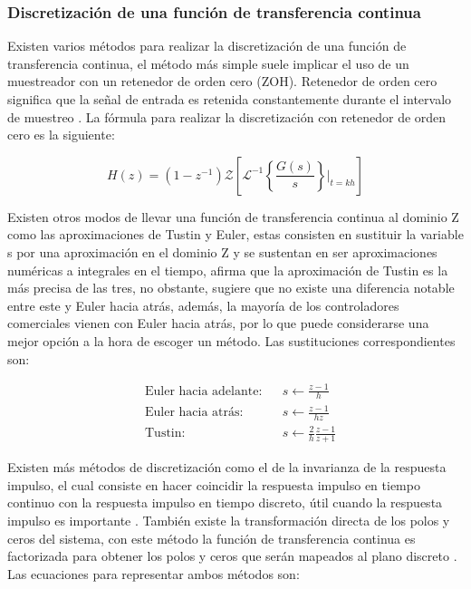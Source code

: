         \subsubsection{Discretización de una función de transferencia continua}
            
            Existen varios métodos para realizar la discretización de una función de transferencia continua, el método más simple suele implicar el uso de un muestreador con un retenedor de orden cero (ZOH). Retenedor de orden cero significa que la señal de entrada es retenida constantemente durante el intervalo de muestreo \Parencite{haugen2005discrete}. La fórmula para realizar la discretización con retenedor de orden cero es la siguiente:

            \begin{equation}\label{eq:ZOH}
                H(z) = (1 - z^{-1}) \mathcal{Z} \left[ \mathcal{L}^{-1}\left\lbrace \frac{G(s)}{s}\right\rbrace\Bigr|_{t=kh}\right]
            \end{equation}

            Existen otros modos de llevar una función de transferencia continua al dominio Z como las aproximaciones de Tustin y Euler, estas consisten en sustituir la variable s por una aproximación en el dominio Z y se sustentan en ser aproximaciones numéricas a integrales en el tiempo, \textcite{haugen2005discrete} afirma que la aproximación de Tustin es la más precisa de las tres, no obstante, sugiere que no existe una diferencia notable entre este y Euler hacia atrás, además, la mayoría de los controladores comerciales vienen con Euler hacia atrás, por lo que puede considerarse una mejor opción a la hora de escoger un método. Las sustituciones correspondientes son:

            \begin{align}
                &\text{Euler hacia adelante:}& &s \leftarrow \frac{z - 1}{h} \label{eq:eulerF}\\
                &\text{Euler hacia atrás:}& &s \leftarrow \frac{z - 1}{hz} \label{eq:eulerB}\\
                &\text{Tustin:}& &s \leftarrow \frac{2}{h} \frac{z-1}{z+1} \label{eq:tustin}
            \end{align}

            Existen más métodos de discretización como el de la invarianza de la respuesta impulso, el cual consiste en hacer coincidir la respuesta impulso en tiempo continuo con la respuesta impulso en tiempo discreto, útil cuando la respuesta impulso es importante \Parencite{fernandez2013control}. También existe la transformación directa de los polos y ceros del sistema, con este método la función de transferencia continua es factorizada para obtener los polos y ceros que serán mapeados al plano discreto \Parencite{hori1992matched}. Las ecuaciones para representar ambos métodos son:

